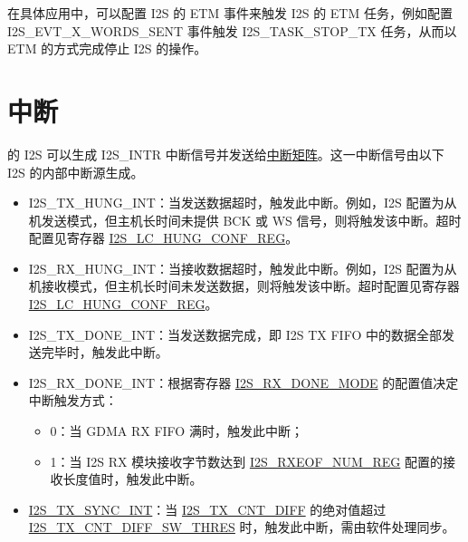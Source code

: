 \documentclass[main\_\_CN.tex]{subfiles}
\begin{document}
在具体应用中，可以配置 I2S 的 ETM 事件来触发 I2S 的 ETM 任务，例如配置 I2S\_EVT\_X\_WORDS\_SENT 事件触发 I2S\_TASK\_STOP\_TX 任务，从而以 ETM 的方式完成停止 I2S 的操作。



\section{中断} \label{sec:i2s-interrupts}

\chipname{} 的 I2S 可以生成 I2S\_INTR 中断信号并发送给\hyperref[mod:intmtrx]{中断矩阵}。这一中断信号由以下 I2S 的内部中断源生成。

\begin{itemize}
\item \label{int:I2STXHUNGINT} I2S\_TX\_HUNG\_INT：当发送数据超时，触发此中断。例如，I2S 配置为从机发送模式，但主机长时间未提供 BCK 或 WS 信号，则将触发该中断。超时配置见寄存器 \hyperref[regdesc:I2SLCHUNGCONFREG]{I2S\_LC\_HUNG\_CONF\_REG}。

\item \label{int:I2SRXHUNGINT} I2S\_RX\_HUNG\_INT：当接收数据超时，触发此中断。例如，I2S 配置为从机接收模式，但主机长时间未发送数据，则将触发该中断。超时配置见寄存器 \hyperref[regdesc:I2SLCHUNGCONFREG]{I2S\_LC\_HUNG\_CONF\_REG}。
\item \label{int:I2STXDONEINT} I2S\_TX\_DONE\_INT：当发送数据完成，即 I2S TX FIFO 中的数据全部发送完毕时，触发此中断。
\item \label{int:I2SRXDONEINT} I2S\_RX\_DONE\_INT：根据寄存器 \hyperref[fielddesc:I2SRXDONEMODE]{I2S\_RX\_DONE\_MODE} 的配置值决定中断触发方式：
    \begin{itemize}
        \item 0：当 GDMA RX FIFO 满时，触发此中断；
        \item 1：当 I2S RX 模块接收字节数达到 \hyperref[regdesc:I2SRXEOFNUMREG]{I2S\_RXEOF\_NUM\_REG} 配置的接收长度值时，触发此中断。
    \end{itemize}
\item \label{int:I2STXSYNCINT}\hyperref[int:I2STXSYNCINT]{I2S\_TX\_SYNC\_INT}：当 \hyperref[fielddesc:I2STXCNTDIFF]{I2S\_TX\_CNT\_DIFF} 的绝对值超过 \hyperref[fielddesc:I2STXCNTDIFFSWTHRES]{I2S\_TX\_CNT\_DIFF\_SW\_THRES} 时，触发此中断，需由软件处理同步。
\end{itemize}
\end{document}
